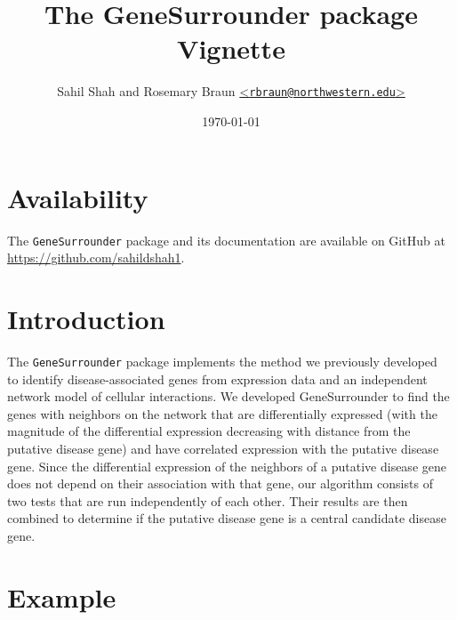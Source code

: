 \documentclass[11pt]{article}
\begin{document}

\title{\vspace{-1cm}The GeneSurrounder package Vignette}

\author{Sahil Shah and Rosemary Braun 
	   \href{mailto:rbraun@northwestern.edu}{<\texttt{rbraun@northwestern.edu}>}}

\date{\today}

\maketitle


\section*{Availability}  %

The \texttt{GeneSurrounder} package and its documentation are available on GitHub at 
\url{https://github.com/sahildshah1}. 


\section*{Introduction}  %

The \texttt{GeneSurrounder} package implements the method we previously developed~\cite{SHAH2017}
to identify disease-associated genes from expression data and an independent
network model of cellular interactions. We developed GeneSurrounder to find the genes
with neighbors on the network that are differentially expressed (with the
magnitude of the differential expression decreasing with distance from the
putative disease gene) and have correlated expression with the putative disease
gene. Since the differential expression of the neighbors of a putative disease
gene does not depend on their association with that gene, our algorithm consists
of two tests that are run independently of each other.
Their results
are then combined to determine if the putative disease gene is a central
candidate disease gene.

\section*{Example} %
\end{document}
